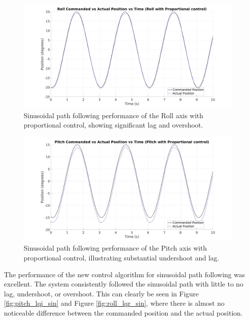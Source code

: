 \begin{figure}[H]
    \centering
    \includegraphics[width=1.0\linewidth]{figures/roll_p_sin.jpg}
    \caption{Sinusoidal path following performance of the Roll axis with proportional control, showing significant lag and overshoot.}
    \label{fig:roll_p_sin}
\end{figure}

\begin{figure}[H]
    \centering
    \includegraphics[width=1.00\linewidth]{figures/pitch_p_sin.jpg}
    \caption{Sinusoidal path following performance of the Pitch axis with proportional control, illustrating substantial undershoot and lag.}
    \label{fig:pitch_p_sin}
\end{figure}

The performance of the new control algorithm for sinusoidal path following was excellent. The system consistently followed the sinusoidal path with little to no lag, undershoot, or overshoot. This can clearly be seen in Figure \ref{fig:pitch_lqi_sin} and Figure \ref{fig:roll_lqr_sin}, where there is almost no noticeable difference between the commanded position and the actual position.

